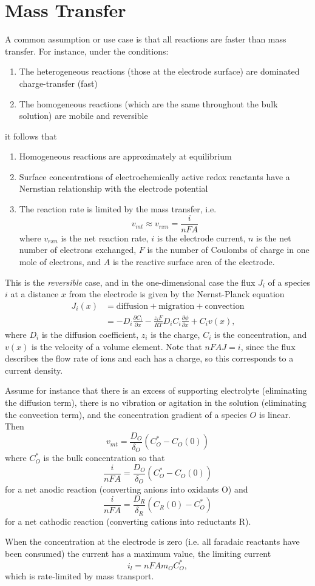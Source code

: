 \section{Mass Transfer}

A common assumption or use case is that all reactions are faster
than mass transfer. For instance, under the conditions:
\begin{enumerate}
  \item{
    The heterogeneous reactions (those at the electrode surface)
    are dominated charge-transfer (fast)
  }
  \item{
    The homogeneous reactions (which are the same throughout the
    bulk solution) are mobile and reversible
  }
\end{enumerate}
it follows that
\begin{enumerate}
  \item{
    Homogeneous reactions are approximately at equilibrium
  }
  \item{
    Surface concentrations of electrochemically active redox
    reactants have a Nernstian relationship with the electrode potential
  }
  \item{
    The reaction rate is limited by the mass transfer, i.e.
    $$
    v_{mt} \approx v_{rxn} = \frac{i}{nFA}
    $$
    where $v_{rxn}$ is the net reaction rate, $i$ is the electrode current,
    $n$ is the net number of electrons exchanged, $F$ is the number of
    Coulombs of charge in one mole of electrons, and $A$ is the reactive
    surface area of the electrode.
  }
\end{enumerate}

This is the \emph{reversible} case, and in the one-dimensional case the
flux $J_i$ of a species $i$ at a distance $x$ from the electrode is given by
the Nernst-Planck equation
\begin{align*}
J_i(x) &= \text{diffusion} + \text{migration} + \text{convection} \\
       &= -D_i \frac{\partial C_i}{\partial x}
          -\frac{z_i F}{RT} D_i C_i \frac{\partial \phi}{\partial x}
          +C_i v(x),
\end{align*}
where $D_i$ is the diffusion coefficient, $z_i$ is the charge, $C_i$ is
the concentration, and $v(x)$ is the velocity of a volume element.
Note that $n F A J = i$, since the flux describes the flow rate of
ions and each has a charge, so this corresponds to a current density.

Assume for instance that there is an excess of supporting electrolyte
(eliminating the diffusion term), there is no vibration or agitation in
the solution (eliminating the convection term), and the concentration
gradient of a species $O$ is linear. Then
$$
v_{mt} = \frac{D_O}{\delta_O}(C_O^\ast - C_O(0))
$$
where $C_O^\ast$ is the bulk concentration so that
$$
\frac{i}{nFA} = \frac{D_O}{\delta_O}(C_O^\ast - C_O(0))
$$
for a net anodic reaction (converting anions into oxidants O) and
$$
\frac{i}{nFA} = \frac{D_R}{\delta_R}(C_R(0) - C_O^\ast)
$$
for a net cathodic reaction (converting cations into reductants R).

When the concentration at the electrode is zero (i.e. all
faradaic reactants have been consumed) the current has a maximum
value, the limiting current
$$
i_l = n F A m_O C_O^\ast,
$$
which is rate-limited by mass transport.
